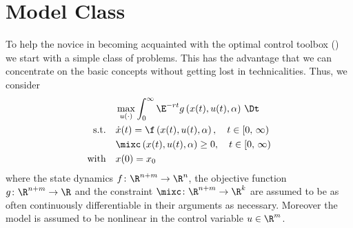 \section{Model Class}
To help the novice in becoming acquainted with the optimal control toolbox (\OCMAT) we start with a simple class of problems. This has the advantage that we can concentrate on the basic concepts without getting lost in technicalities. Thus, we consider 
\begin{subequations}
\label{eq:simple_simple_opt_pro}
\begin{align}
& \max_{u(\cdot)}\int_0^\infty\E^{-rt}g\left(x(t),u(t),\modelpar\right)\,\Dt\label{eq:simple_opt_pro_obj}\\
\text{s.t.}\quad & \dot{x}(t) =\f\left(x(t),u(t),\modelpar\right),\quad t\in[0,\,\infty)\label{eq:simple_opt_pro_dyn}\\
& \mixc\left(x(t),u(t),\modelpar\right)\ge0,\quad t\in[0,\,\infty)\label{eq:simple_opt_pro_mc}\\
\text{with}\quad & x(0) = x_0\label{eq:simple_opt_pro_init}
\end{align}
\end{subequations}
where the state dynamics $f\colon\R^{n+m}\rightarrow\R^n$, the objective function $g\colon\R^{n+m}\rightarrow\R$ and the constraint $\mixc\colon\R^{n+m}\to\R^k$ are assumed to be as often continuously differentiable in their arguments as necessary. Moreover the model is assumed to be nonlinear in the control variable $u\in\R^m$.

